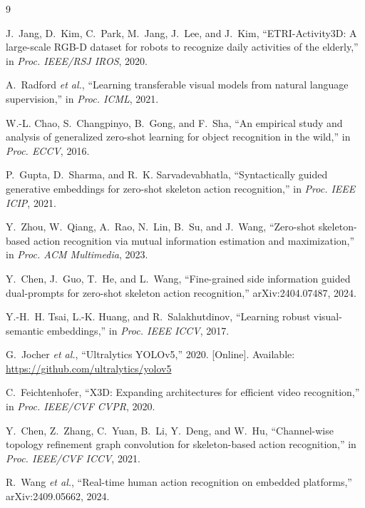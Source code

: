 \begin{thebibliography}{9}

J.~Jang, D.~Kim, C.~Park, M.~Jang, J.~Lee, and J.~Kim,
``ETRI-Activity3D: A large-scale RGB-D dataset for robots to recognize daily
activities of the elderly,'' in \emph{Proc. IEEE/RSJ IROS}, 2020.

A.~Radford \emph{et al.},
``Learning transferable visual models from natural language supervision,''
in \emph{Proc. ICML}, 2021.

W.-L. Chao, S.~Changpinyo, B.~Gong, and F.~Sha,
``An empirical study and analysis of generalized zero-shot learning for
object recognition in the wild,'' in \emph{Proc. ECCV}, 2016.

P.~Gupta, D.~Sharma, and R.~K. Sarvadevabhatla,
``Syntactically guided generative embeddings for zero-shot skeleton action
recognition,'' in \emph{Proc. IEEE ICIP}, 2021.

Y.~Zhou, W.~Qiang, A.~Rao, N.~Lin, B.~Su, and J.~Wang,
``Zero-shot skeleton-based action recognition via mutual information
estimation and maximization,'' in \emph{Proc. ACM Multimedia}, 2023.

Y.~Chen, J.~Guo, T.~He, and L.~Wang,
``Fine-grained side information guided dual-prompts for zero-shot skeleton
action recognition,'' arXiv:2404.07487, 2024.

Y.-H.~H. Tsai, L.-K. Huang, and R.~Salakhutdinov,
``Learning robust visual-semantic embeddings,'' in \emph{Proc. IEEE ICCV},
2017.

G.~Jocher \emph{et al.}, ``Ultralytics YOLOv5,'' 2020. [Online].
Available: \url{https://github.com/ultralytics/yolov5}

C.~Feichtenhofer, ``X3D: Expanding architectures for efficient video
recognition,'' in \emph{Proc. IEEE/CVF CVPR}, 2020.

Y.~Chen, Z.~Zhang, C.~Yuan, B.~Li, Y.~Deng, and W.~Hu,
``Channel-wise topology refinement graph convolution for skeleton-based
action recognition,'' in \emph{Proc. IEEE/CVF ICCV}, 2021.

R.~Wang \emph{et al.}, ``Real-time human action recognition on embedded
platforms,'' arXiv:2409.05662, 2024.

\end{thebibliography}
